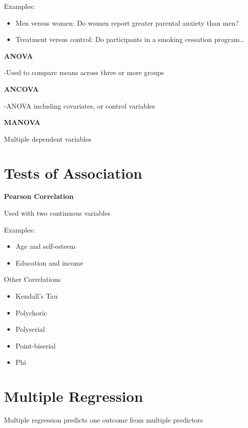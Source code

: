 \documentclass[
  letterpaper,
  DIV=11,
  numbers=noendperiod]{scrreprt}
\providecommand{\tightlist}{%
  \setlength{\itemsep}{0pt}\setlength{\parskip}{0pt}}
\begin{document}
Examples:

\begin{itemize}
\tightlist
\item
  Men versus women: Do women report greater parental anxiety than men?
\item
  Treatment versus control: Do participants in a smoking cessation
  program\ldots{}
\end{itemize}

\textbf{ANOVA}

-Used to compare means across three or more groups

\textbf{ANCOVA}

-ANOVA including covariates, or control variables

\textbf{MANOVA}

Multiple dependent variables


\chapter{Tests of Association}\label{tests-of-association}

\textbf{Pearson Correlation}

Used with two continuous variables

Examples:

\begin{itemize}
\tightlist
\item
  Age and self-esteem
\item
  Education and income
\end{itemize}

Other Correlations

\begin{itemize}
\tightlist
\item
  Kendall's Tau
\item
  Polychoric
\item
  Polyserial
\item
  Point-biserial
\item
  Phi
\end{itemize}


\chapter{Multiple Regression}\label{multiple-regression}

Multiple regression predicts one outcome from multiple predictors
\end{document}
